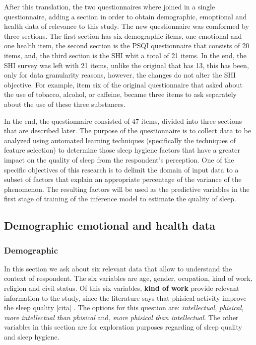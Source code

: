 \documentclass[]{book}
\begin{document}
After this translation, the two questionnaires where joined in a single
questionnaire, adding a section in order to obtain demographic,
emoptional and health data of relevance to this study. The new
questionnaire was comformed by three sections. The first section has six
demographic items, one emotional and one health item, the second section
is the PSQI questionnaire that consists of 20 items, and, the third
section is the SHI whit a total of 21 items. In the end, the SHI survey
was left with 21 items, unlike the original that has 13, this has been,
only for data granularity reasons, however, the changes do not alter the
SHI objective. For example, item six of the original questionnaire that
asked about the use of tobacco, alcohol, or caffeine, became three items
to ask separately about the use of these three substances.

In the end, the questionnaire consisted of 47 items, divided into three
sections that are described later. The purpose of the questionnaire is
to collect data to be analyzed using automated learning techniques
(specifically the techniques of feature selection) to determine those
sleep hygiene factors that have a greater impact on the quality of sleep
from the respondent's perception. One of the specific objectives of this
research is to delimit the domain of input data to a subset of factors
that explain an appropriate percentage of the variance of the
phenomenon. The resulting factors will be used as the predictive
variables in the first stage of training of the inference model to
estimate the quality of sleep.

\subsection{Demographic emotional and health
data}\label{demographic-emotional-and-health-data}

\subsubsection{Demographic}\label{demographic}

In this section we ask about six relevant data that allow to understand
the context of respondent. The six variables are age, gender, ocupation,
kind of work, religion and civil status. Of this six variables,
\textbf{kind of work} provide relevant information to the study, since
the literature says that phisical activity improve the sleep quality
{[}cita{]} . The options for this question are: \emph{intellectual},
\emph{phisical}, \emph{more intellectual than phisical} and, \emph{more
phisical than intellectual}. The other variables in this section are for
exploration purposes regarding of sleep quality and sleep hygiene.
\end{document}
